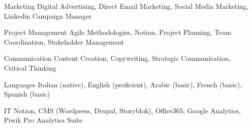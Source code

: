 

\begin{cvskills}

\cvskill
{Marketing } %
{Digital Advertising, Direct Email Marketing, Social Media Marketing, Linkedin Campaign Manager}

\cvskill
{Project Management} %
{Agile Methodologies, Notion, Project Planning, Team Coordination, Stakeholder Management} %

\cvskill
{Communication} %
{Content Creation, Copywriting, Strategic Communication, Critical Thinking} %



\cvskill
{Languages} %
{Italian (native), English (proficient), Arabic (basic), French (basic), Spanish (basic)} %


\cvskill
{IT} %
{Notion, CMS (Wordpress, Drupal, Storyblok), Office365, Google Analytics, Piwik Pro Analytics Suite} %

\end{cvskills}

